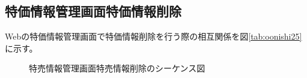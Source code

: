\documentclass[a4j]{jarticle}
\begin{document}
\subsection{特価情報管理画面特価情報削除}
Webの特価情報管理画面で特価情報削除を行う際の相互関係を図\ref {tab:oonishi25}に示す。
\begin{figure}[hb]
\begin{center}
\caption{特売情報管理画面特売情報削除のシーケンス図}
\label{oonishi25}
\end{center}
\end{figure}
\end{document}
